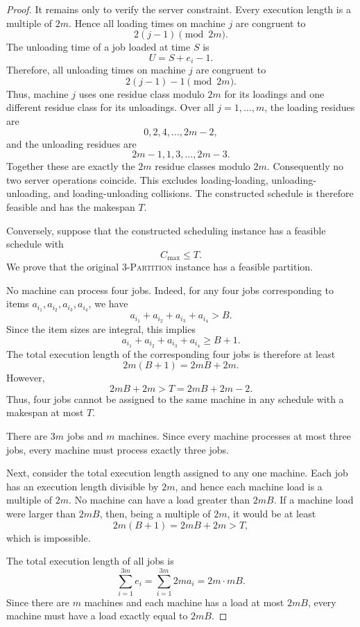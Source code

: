 \documentclass[10pt,a4paper]{amsart}
\begin{document}
\begin{proof}
It remains only to verify the server constraint. Every execution length is a
multiple of \(2m\). Hence all loading times on machine \(j\) are congruent to
\[
        2(j-1) \pmod{2m}.
\]
The unloading time of a job loaded at time \(S\) is
\[
        U=S+e_i-1.
\]
Therefore, all unloading times on machine \(j\) are congruent to
\[
        2(j-1)-1 \pmod{2m}.
\]
Thus, machine \(j\) uses one residue class modulo \(2m\) for its loadings and one
different residue class for its unloadings. Over all \(j=1,\ldots,m\), the
loading residues are
\[
        0,2,4,\ldots,2m-2,
\]
and the unloading residues are
\[
        2m-1,1,3,\ldots,2m-3.
\]
Together these are exactly the \(2m\) residue classes modulo \(2m\). Consequently
no two server operations coincide. This excludes loading-loading,
unloading-unloading, and loading-unloading collisions. The constructed schedule
is therefore feasible and has the makespan \(T\).

Conversely, suppose that the constructed scheduling instance has a feasible
schedule with
\[
        C_{\max}\le T.
\]
We prove that the original \textsc{3-Partition} instance has a feasible
partition.

No machine can process four jobs. Indeed, for any four jobs corresponding to
items \(a_{i_1},a_{i_2},a_{i_3},a_{i_4}\), we have
\[
        a_{i_1}+a_{i_2}+a_{i_3}+a_{i_4}>B.
\]
Since the item sizes are integral, this implies
\[
        a_{i_1}+a_{i_2}+a_{i_3}+a_{i_4}\ge B+1.
\]
The total execution length of the corresponding four jobs is therefore at least
\[
        2m(B+1)=2mB+2m.
\]
However, 
\[
        2mB+2m>T=2mB+2m-2.
\]
Thus, four jobs cannot be assigned to the same machine in any schedule with a 
makespan at most \(T\).

There are \(3m\) jobs and \(m\) machines. Since every machine processes at most
three jobs, every machine must process exactly three jobs.

Next, consider the total execution length assigned to any one machine. Each job
has an execution length divisible by \(2m\), and hence each machine load is a
multiple of \(2m\). No machine can have a load greater than \(2mB\). If a machine
load were larger than \(2mB\), then, being a multiple of \(2m\), it would be at
least
\[
        2m(B+1)=2mB+2m>T,
\]
which is impossible.

The total execution length of all jobs is
\[
        \sum_{i=1}^{3m} e_i
        =
        \sum_{i=1}^{3m}2m a_i
        =
        2m\cdot mB .
\]
Since there are \(m\) machines and each machine has a load at most \(2mB\), every
machine must have a load exactly equal to \(2mB\).


\end{proof}
\end{document}
